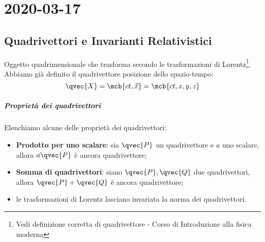 \chapter{2020-03-17}
\section{Quadrivettori e Invarianti Relativistici}
Oggetto quadrimensionale che trasforma secondo le trasformazioni di
Lorentz\footnote{
  Vedi definizione corretta di quadrivettore - Corso di Introduzione alla
  fisica moderna
}. Abbiamo già definito il quadrivettore posizione dello spazio-tempo:
\begin{equation}
  \qvec{X} = \mcb{ct,\vec{x}} = \mcb{ct,x,y,z}
\end{equation}

\paragraph{Proprietà dei quadrivettori}
Elenchiamo alcune delle proprietà dei quadrivettori:
\begin{itemize}
  \item \textbf{Prodotto per uno scalare}: sia $\qvec{P}$ un quadrivettore e
    $a$ uno scalare, allora $a \qvec{P}$ è ancora quadrivettore;
  \item \textbf{Somma di quadrivettori}: siano $\qvec{P}, \qvec{Q}$ due
    quadrivettori, allora $\qvec{P} + \qvec{Q}$ è ancora quadrivettore;
  \item le trasformazioni di Lorentz lasciano invariata la norma dei
    quadrivettori.
\end{itemize}

